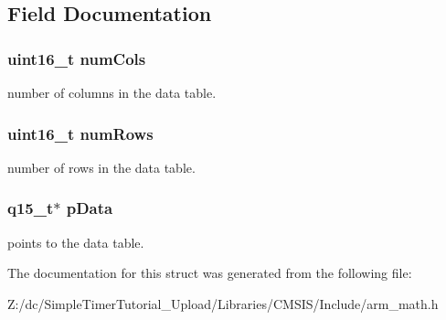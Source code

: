 \subsection{Field Documentation}
\hypertarget{structarm__bilinear__interp__instance__q15_a4bb5ec0d13eb4c9cf887aa8366a44117}{
\subsubsection[{num\-Cols}]{\setlength{\rightskip}{0pt plus 5cm}uint16\-\_\-t num\-Cols}}\label{structarm__bilinear__interp__instance__q15_a4bb5ec0d13eb4c9cf887aa8366a44117}
number of columns in the data table. \hypertarget{structarm__bilinear__interp__instance__q15_a1bcf80ccdc2acc29198f1592ae300390}{
\subsubsection[{num\-Rows}]{\setlength{\rightskip}{0pt plus 5cm}uint16\-\_\-t num\-Rows}}\label{structarm__bilinear__interp__instance__q15_a1bcf80ccdc2acc29198f1592ae300390}
number of rows in the data table. \hypertarget{structarm__bilinear__interp__instance__q15_a817ede38365e63e561a12069c6c5c087}{
\subsubsection[{p\-Data}]{\setlength{\rightskip}{0pt plus 5cm}q15\-\_\-t$\ast$ p\-Data}}\label{structarm__bilinear__interp__instance__q15_a817ede38365e63e561a12069c6c5c087}
points to the data table. 

The documentation for this struct was generated from the following file\-:\begin{DoxyCompactItemize}
\item 
Z\-:/dc/\-Simple\-Timer\-Tutorial\-\_\-\-Upload/\-Libraries/\-C\-M\-S\-I\-S/\-Include/arm\-\_\-math.\-h\end{DoxyCompactItemize}
